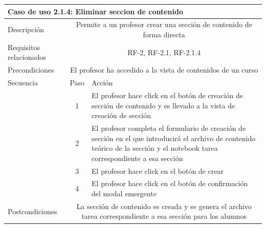 \begin{tabular}[H]{l c l}
\toprule 
\multicolumn{3}{l}{\textbf{Caso de uso 2.1.4: Eliminar seccion de contenido}}\\
\midrule
Descripción & \multicolumn{2}{p{10cm}}{Permite a un profesor crear una sección de contenido de forma directa}\\
\midrule
Requisitos relacionados & \multicolumn{2}{p{10cm}}{RF-2, RF-2.1, RF-2.1.4}\\
\midrule
Precondiciones & \multicolumn{2}{p{10cm}}{El profesor ha accedido a la vista de contenidos de un curso}\\
\midrule
Secuencia & Paso & Acción \\
\cmidrule{2-3}
         & 1 &  \multicolumn{1}{p{8cm}}{El profesor hace click en el botón de creación de sección de contenido y es llevado a la vista de creación de sección}\\
         & 2 &  \multicolumn{1}{p{8cm}}{El profesor completa el formulario de creación de sección en el que introducirá el archivo de contenido teórico de la sección y el notebook tarea correspondiente a esa sección}\\
         & 3 &  \multicolumn{1}{p{8cm}}{El profesor hace click en el botón de crear}\\
         & 4 &  \multicolumn{1}{p{8cm}}{El profesor hace click en el botón de confirmación del modal emergente}\\
         
\midrule
Postcondiciones & \multicolumn{2}{p{10cm}}{La sección de contenido es creada y se genera el archivo tarea correspondiente a esa sección para los alumnos}\\
\bottomrule 
\end{tabular}

\hspace{3cm}

